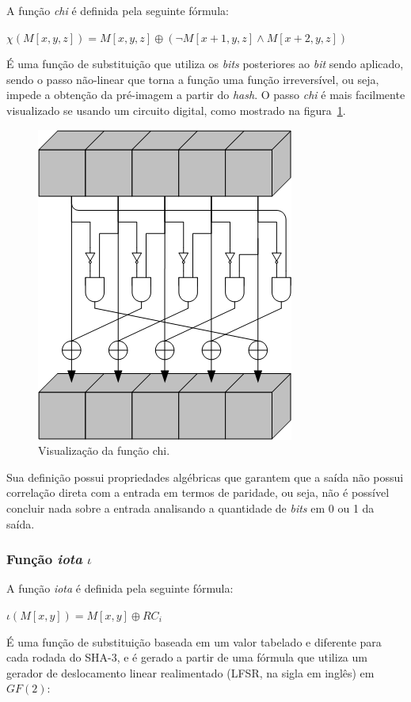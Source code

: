 A função \textit{chi} é definida pela seguinte fórmula:

$\chi(M[x, y, z]) = M[x, y, z] \oplus (\neg{M}[x+1, y, z] \land M[x+2, y, z])$

É uma função de substituição que utiliza os \textit{bits} posteriores ao
\textit{bit} sendo aplicado, sendo o passo não-linear que torna a função
\Keccak uma função irreversível, ou seja, impede a obtenção da pré-imagem a
partir do \textit{hash}. O passo \textit{chi} é mais facilmente visualizado se
usando um circuito digital, como mostrado na figura~\ref{fig:chi}.

\begin{figure}[ht]
    \centering
    \includegraphics{images/chi.png}
    \caption{Visualização da função chi.}
    \label{fig:chi}
\end{figure}

Sua definição possui propriedades algébricas que garantem que a saída não
possui correlação direta com a entrada em termos de paridade, ou seja, não é
possível concluir nada sobre a entrada analisando a quantidade de \textit{bits}
em 0 ou 1 da saída.

\subsubsection{Função \textit{iota} $\iota$}

A função \textit{iota} é definida pela seguinte fórmula:

$\iota(M[x, y]) = M[x, y] \oplus RC_{i}$

É uma função de substituição baseada em um valor tabelado e diferente para cada
rodada do SHA-3, e é gerado a partir de uma fórmula que utiliza um gerador de
deslocamento linear realimentado (LFSR, na sigla em inglês) em $GF(2)$:

